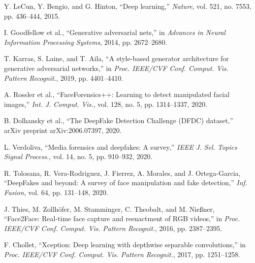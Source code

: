 \documentclass[conference]{IEEEtran}
\begin{document}



\begin{thebibliography}{99}

Y. LeCun, Y. Bengio, and G. Hinton, ``Deep learning,'' \textit{Nature}, vol. 521, no. 7553, pp. 436--444, 2015.

I. Goodfellow et al., ``Generative adversarial nets,'' in \textit{Advances in Neural Information Processing Systems}, 2014, pp. 2672--2680.

T. Karras, S. Laine, and T. Aila, ``A style-based generator architecture for generative adversarial networks,'' in \textit{Proc. IEEE/CVF Conf. Comput. Vis. Pattern Recognit.}, 2019, pp. 4401--4410.

A. Rossler et al., ``FaceForensics++: Learning to detect manipulated facial images,'' \textit{Int. J. Comput. Vis.}, vol. 128, no. 5, pp. 1314--1337, 2020.

B. Dolhansky et al., ``The DeepFake Detection Challenge (DFDC) dataset,'' arXiv preprint arXiv:2006.07397, 2020.

L. Verdoliva, ``Media forensics and deepfakes: A survey,'' \textit{IEEE J. Sel. Topics Signal Process.}, vol. 14, no. 5, pp. 910--932, 2020.

R. Tolosana, R. Vera-Rodriguez, J. Fierrez, A. Morales, and J. Ortega-Garcia, ``DeepFakes and beyond: A survey of face manipulation and fake detection,'' \textit{Inf. Fusion}, vol. 64, pp. 131--148, 2020.

J. Thies, M. Zollhöfer, M. Stamminger, C. Theobalt, and M. Nießner, ``Face2Face: Real-time face capture and reenactment of RGB videos,'' in \textit{Proc. IEEE/CVF Conf. Comput. Vis. Pattern Recognit.}, 2016, pp. 2387--2395.

F. Chollet, ``Xception: Deep learning with depthwise separable convolutions,'' in \textit{Proc. IEEE/CVF Conf. Comput. Vis. Pattern Recognit.}, 2017, pp. 1251--1258.


\end{thebibliography}
\end{document}
